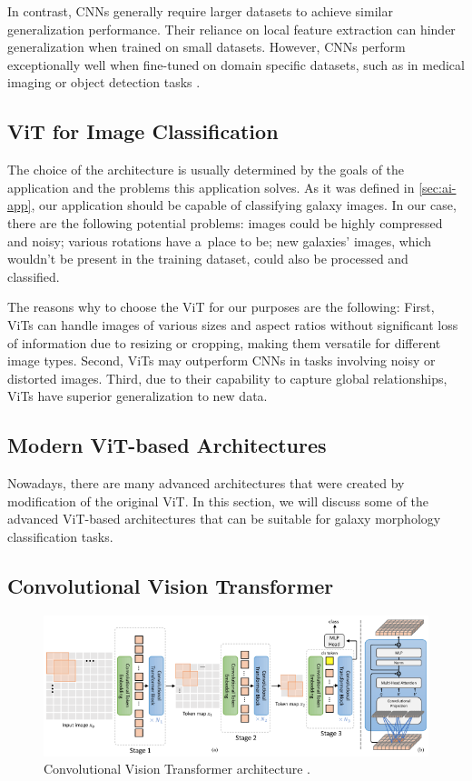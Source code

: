In contrast, CNNs generally require larger datasets to achieve similar generalization performance. Their reliance on local feature extraction can hinder generalization when trained on small datasets. However, CNNs perform exceptionally well when fine-tuned on domain specific datasets, such as in medical imaging or object detection tasks \cite{app13095521}.

\subsection*{ViT for Image Classification}

The choice of the architecture is usually determined by the goals of the application and the problems this application solves. As it was defined in \autoref{sec:ai-app}, our application should be capable of classifying galaxy images. In our case, there are the following potential problems: images could be highly compressed and noisy; various rotations have a~place to be; new galaxies' images, which wouldn't be present in the training dataset, could also be processed and classified. 

\medskip

The reasons why to choose the ViT for our purposes are the following: First, ViTs can handle images of various sizes and aspect ratios without significant loss of information due to resizing or cropping, making them versatile for different image types. Second, ViTs may outperform CNNs in tasks involving noisy or distorted images. Third, due to their capability to capture global relationships, ViTs have superior generalization to new data.

\subsection*{Modern ViT-based Architectures}

Nowadays, there are many advanced architectures that were created by modification of the original ViT. In this section, we will discuss some of the advanced ViT-based architectures that can be suitable for galaxy morphology classification tasks. 

\subsection*{Convolutional Vision Transformer}

\begin{figure}[htbp]
    \centering
    \includegraphics[width=\linewidth]{obrazky-figures/02-theoretical-basis/cvt.png}
    \caption{Convolutional Vision Transformer architecture \cite{wu2021cvtintroducingconvolutionsvision}.}
    \label{fig:cvt}
\end{figure}

